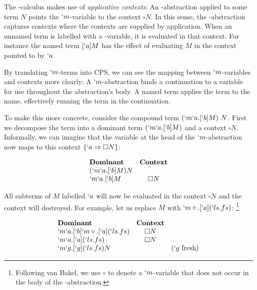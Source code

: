   The \lmu-calculus makes use of \emph{applicative contexts}:
  An \lmu-abstraction applied to some term $N$ points the $`m$-variable to the context $\square N$.
  In this sense, the \lmu-abstraction captures contexts where the contexts are supplied by application.
  When an unnamed term is labelled with a \lmu-variable, it is evaluated in that context. 
  For instance the named term $[`a]M$ has the effect of evaluating $M$ in the context pointed to by $`a$.
  
  By translating $`m$-terms into CPS, we can see the mapping between $`m$-variables and contexts more clearly:
  A $`m$-abstraction binds a continuation to a variable for use throughout the abstraction's body.
  A named term applies the term to the name, effectively running the term in the continuation.
  
  To make this more concrete, consider the compound term $(`m`a.[`b]M)\ N$. 
  First we decompose the term into a dominant term $(`m`a.[`b]M)$ and a 
  context $\square N$. Informally, we can imagine that the variable at the head of the $`m$-abstraction now maps to this context $\{`a \Rightarrow \square N\}$:
  
  \begin{example}[]
    \[
    \begin{array}{lc}
    \textbf{Dominant} & \textbf{Context} \\
    (`m`a.[`b]M) N \\
    `m`a.[`b]M & \square N \\
    \end{array}
    \]
  \end{example}

  All subterms of $M$ labelled $`a$ will now be evaluated in the context 
  $\square N$ and the context will destroyed. For example, let us replace 
  $M$ with \mbox{$`m\circ.[`a](`ls.fs)$}:
  \footnote{Following van Bakel, we use $\circ$ to denote a $`m$-variable that does not occur in the body of the \lmu-abstraction.}
  
  \begin{example}
    \[
    \begin{array}{lcr}
    \textbf{Dominant} & \textbf{Context} \\
    `m`a.[`b]`m\circ.[`a](`ls.fs)    & \square N \\
    `m`a.[`a](`ls.fs)    & \square N \\
    `m`g.[`g](`ls.fs)N   & & (`g\ \text{fresh})  \\
    \end{array}
    \]
  \end{example}

